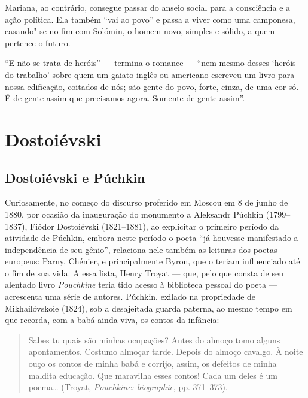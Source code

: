 Mariana, ao contrário, consegue passar do anseio social para a
consciência e a ação política. Ela também ``vai ao povo'' e passa a
viver como uma camponesa, casando"-se no fim com Solómin, o homem novo,
simples e sólido, a quem pertence o futuro.

``E não se trata de heróis'' --- termina o romance --- ``nem mesmo desses
`heróis do trabalho' sobre quem um gaiato inglês ou americano escreveu
um livro para nossa edificação, coitados de nós; são gente do povo,
forte, cinza, de uma cor só. É de gente assim que precisamos agora.
Somente de gente assim''.

\part{Dostoiévski}

\chapter{Dostoiévski e Púchkin}

Curiosamente, no começo do discurso proferido em Moscou em 8 de junho de
1880, por ocasião da inauguração do monumento a Aleksandr Púchkin
(1799--1837), Fiódor Dostoiévski (1821--1881), ao explicitar o primeiro
período da atividade de Púchkin, embora neste período o poeta ``já houvesse
manifestado a independência de seu gênio'', relaciona nele também as
leituras dos poetas europeus: Parny, Chénier, e principalmente Byron,
que o teriam influenciado até o fim de sua vida. A essa lista, Henry
Troyat --- que, pelo que consta de seu alentado livro \emph{Pouchkine}
teria tido acesso à biblioteca pessoal do poeta --- acrescenta uma série
de autores. Púchkin, exilado na propriedade de Mikhailóvskoie (1824), sob a
desajeitada guarda paterna, ao mesmo tempo em que recorda, com a babá
ainda viva, os contos da infância:

\begin{quote}
Sabes tu quais são minhas ocupações? Antes do almoço tomo alguns
apontamentos. Costumo almoçar tarde. Depois do almoço cavalgo. À noite
ouço os contos de minha babá e corrijo, assim, os defeitos de minha
maldita educação. Que maravilha esses contos! Cada um deles é um
poema\ldots{} (Troyat, \emph{Pouchkine: biographie}, pp. 371--373).
\end{quote}


